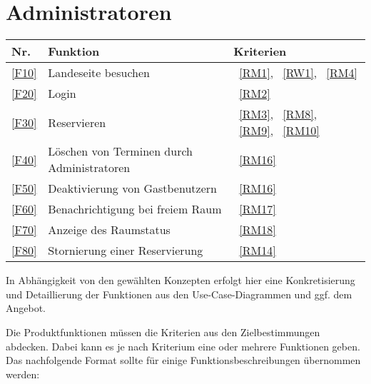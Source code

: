 \section{Administratoren}\label{sec:adminfunktionen}

\begin{table}[htbp]
    \centering
    \begin{tabularx}{\textwidth}{ l|X|l }
        \textbf{Nr.} & \textbf{Funktion} & \textbf{Kriterien} \\ \hline\hline
        \ref{F10} & Landeseite besuchen &~\ref{RM1}, ~\ref{RW1}, ~\ref{RM4} \\
        \ref{F20} & Login &~\ref{RM2} \\
        \ref{F30} & Reservieren &~\ref{RM3}, ~\ref{RM8}, ~\ref{RM9}, ~\ref{RM10} \\
        \ref{F40} & Löschen von Terminen durch Administratoren &~\ref{RM16} \\
        \ref{F50} & Deaktivierung von Gastbenutzern &~\ref{RM16} \\
        \ref{F60} & Benachrichtigung bei freiem Raum &~\ref{RM17} \\
        \ref{F70} & Anzeige des Raumstatus &~\ref{RM18} \\
        \ref{F80} & Stornierung einer Reservierung &~\ref{RM14} \\
    \end{tabularx}
    \label{tab:adminfunctions}
\end{table}


\iffalse
In Abhängigkeit von den gewählten Konzepten erfolgt hier eine Konkretisierung
und Detaillierung der Funktionen aus den Use-Case-Diagrammen und ggf. dem
Angebot.

Die Produktfunktionen müssen die Kriterien aus den Zielbestimmungen abdecken.
Dabei kann es je nach Kriterium eine oder mehrere Funktionen geben.
Das nachfolgende Format sollte für einige Funktionsbeschreibungen übernommen werden:

